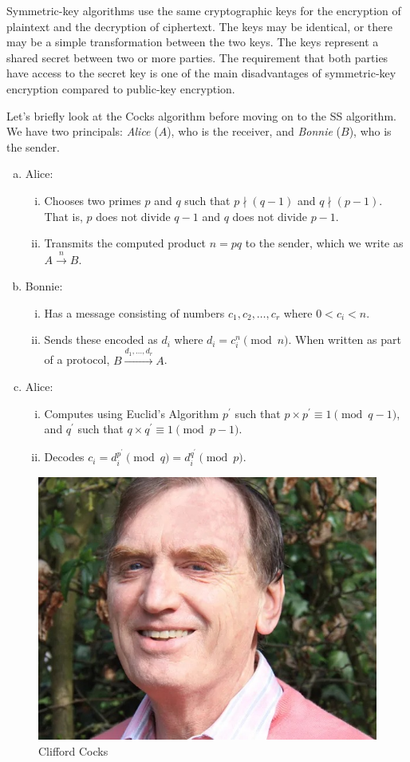 Symmetric-key algorithms use the same cryptographic keys for the
encryption of plaintext and the decryption of ciphertext. The keys may
be identical, or there may be a simple transformation between the two
keys. The keys represent a shared secret between two or more parties.
The requirement that both parties have access to the secret key is one
of the main disadvantages of symmetric-key encryption compared to
public-key encryption.

Let's briefly look at the Cocks algorithm before moving on to the
SS algorithm.  We have two principals: \emph{Alice} ($A$), who is
the receiver, and \emph{Bonnie} ($B$), who is the sender.

\begin{enumerate}[(a)]
  \item Alice:
  \begin{enumerate}[i.]
    \item Chooses two primes $p$ and $q$ such that $p \nmid (q-1)$ and $q
    \nmid (p-1)$. That is, $p$ does not divide $q-1$ and $q$ does not
      divide $p -1$.
    \item Transmits the computed product $n = p q$ to the sender, which we
      write as $A \xrightarrow{n} B$.
  \end{enumerate}
  \item Bonnie:
  \begin{enumerate}[i.]
    \item Has a message consisting of numbers $c_1, c_2, \ldots, c_r$
      where $0 < c_i < n$.
    \item Sends these encoded as $d_i$ where $d_i = c_i^n \pmod{n}$.
      When written as part of a protocol, $B \xrightarrow{d_1, \ldots,
      d_r} A$.
  \end{enumerate}
  \item Alice:
  \begin{enumerate}[i.]
    \item Computes using Euclid's Algorithm $p^\prime$ such that
      $p\times p^\prime \equiv 1 \pmod{q-1}$, and $q^\prime$ such that
      $q\times q^\prime \equiv 1 \pmod{p-1}$.
    \item Decodes $c_i = d_i^{p^\prime} \pmod{q} = d_i^{q^\prime}
      \pmod{p}$.
  \end{enumerate}
\end{enumerate}

\begin{figure}[tbhp]
        \centering
\includegraphics[height=0.33\textwidth]{./images/cliff-cocks.jpg}
        \caption{Clifford Cocks}\label{fig:cocks}
\end{figure}

